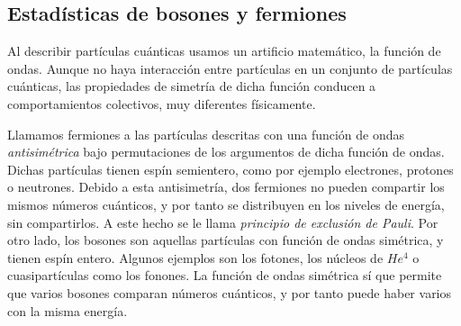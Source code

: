 \documentclass[11pt, a4paper]{article} %
\theoremstyle{named}
\newcommand*\button[1]{
\tikz[baseline=(key.base)]
\node[%
draw,
fill=white,
drop shadow={shadow xshift=0.25ex,shadow yshift=-0.25ex,fill=black,opacity=0.75},
rectangle,
rounded corners=2pt,
inner sep=1pt,
line width=0.5pt,
font=\scriptsize\sffamily
](key) {#1\strut}
;
}
\begin{document}







\subsection{Estadísticas de bosones y fermiones}\label{sec:bosefermi}

Al describir partículas cuánticas usamos un artificio matemático, la función de ondas. Aunque no haya interacción entre partículas en un conjunto de partículas cuánticas, las propiedades de simetría de dicha función conducen a comportamientos colectivos, muy diferentes físicamente.

Llamamos fermiones a las partículas descritas con una función de ondas \textit{antisimétrica} bajo permutaciones de los argumentos de dicha función de ondas. Dichas partículas tienen espín semientero, como por ejemplo electrones, protones o neutrones. Debido a esta antisimetría, dos fermiones no pueden compartir los mismos números cuánticos, y por tanto se distribuyen en los niveles de energía, sin compartirlos. A este hecho se le llama \textit{principio de exclusión de Pauli}. Por otro lado, los bosones son aquellas partículas con función de ondas simétrica, y tienen espín entero. Algunos  ejemplos son los fotones, los núcleos de $He^4$ o cuasipartículas como los fonones. La función de ondas simétrica sí que permite que varios bosones comparan números cuánticos, y por tanto puede haber varios con la misma energía.
\end{document}
